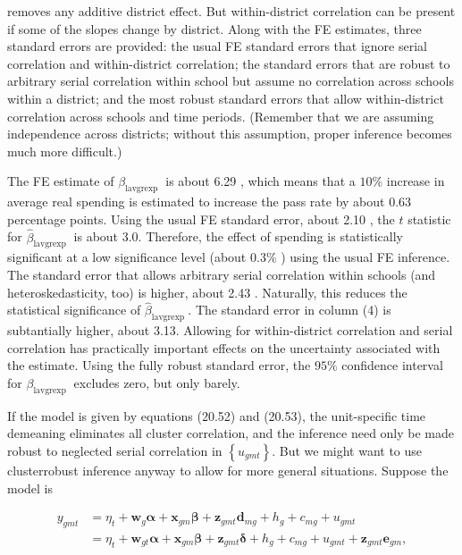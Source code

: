 \documentclass[10pt]{article}
\begin{document}
removes any additive district effect. But within-district correlation can be present if some of the slopes change by district. Along with the FE estimates, three standard errors are provided: the usual FE standard errors that ignore serial correlation and within-district correlation; the standard errors that are robust to arbitrary serial correlation within school but assume no correlation across schools within a district; and the most robust standard errors that allow within-district correlation across schools and time periods. (Remember that we are assuming independence across districts; without this assumption, proper inference becomes much more difficult.)

The FE estimate of $\beta_{\text {lavgrexp }}$ is about 6.29 , which means that a $10 \%$ increase in average real spending is estimated to increase the pass rate by about 0.63 percentage points. Using the usual FE standard error, about 2.10 , the $t$ statistic for $\hat{\beta}_{\text {lavgrexp }}$ is about 3.0. Therefore, the effect of spending is statistically significant at a low significance level (about $0.3 \%$ ) using the usual FE inference. The standard error that allows arbitrary serial correlation within schools (and heteroskedasticity, too) is higher, about 2.43 . Naturally, this reduces the statistical significance of $\hat{\beta}_{\text {lavgrexp }}$. The standard error in column (4) is subtantially higher, about 3.13. Allowing for within-district correlation and serial correlation has practically important effects on the uncertainty associated with the estimate. Using the fully robust standard error, the $95 \%$ confidence interval for $\beta_{\text {lavgrexp }}$ excludes zero, but only barely.

If the model is given by equations (20.52) and (20.53), the unit-specific time demeaning eliminates all cluster correlation, and the inference need only be made robust to neglected serial correlation in $\left\{u_{g m t}\right\}$. But we might want to use clusterrobust inference anyway to allow for more general situations. Suppose the model is


\begin{align*}
y_{g m t} & =\eta_{t}+\mathbf{w}_{g} \boldsymbol{\alpha}+\mathbf{x}_{g m} \boldsymbol{\beta}+\mathbf{z}_{g m t} \mathbf{d}_{m g}+h_{g}+c_{m g}+u_{g m t} \\
& =\eta_{t}+\mathbf{w}_{g t} \boldsymbol{\alpha}+\mathbf{x}_{g m} \boldsymbol{\beta}+\mathbf{z}_{g m t} \boldsymbol{\delta}+h_{g}+c_{m g}+u_{g m t}+\mathbf{z}_{g m t} \mathbf{e}_{g m}, \tag{20.57}
\end{align*}
\end{document}
